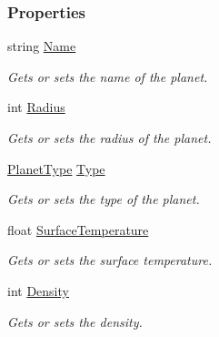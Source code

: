 \subsubsection*{Properties}
\begin{DoxyCompactItemize}
\item 
string \hyperlink{class_midnight_blue_1_1_planet_metadata_a7afda7361d57bbbf9bb9d6be47167149}{Name}
\begin{DoxyCompactList}\small\item\em Gets or sets the name of the planet. \end{DoxyCompactList}\item 
int \hyperlink{class_midnight_blue_1_1_planet_metadata_a2aa80bee630ca09d10ab12c7734e1ea4}{Radius}
\begin{DoxyCompactList}\small\item\em Gets or sets the radius of the planet. \end{DoxyCompactList}\item 
\hyperlink{namespace_midnight_blue_a4a799009a18b57979628708589ae53e3}{Planet\+Type} \hyperlink{class_midnight_blue_1_1_planet_metadata_a9d8ec38e5924a68970df4795c6185971}{Type}
\begin{DoxyCompactList}\small\item\em Gets or sets the type of the planet. \end{DoxyCompactList}\item 
float \hyperlink{class_midnight_blue_1_1_planet_metadata_a6902b9cd6ac9400696c6aaa74a52821f}{Surface\+Temperature}
\begin{DoxyCompactList}\small\item\em Gets or sets the surface temperature. \end{DoxyCompactList}\item 
int \hyperlink{class_midnight_blue_1_1_planet_metadata_a6f3fe53543f04e24f107c6464b03d885}{Density}
\begin{DoxyCompactList}\small\item\em Gets or sets the density. \end{DoxyCompactList}\item 

\end{DoxyCompactItemize}
